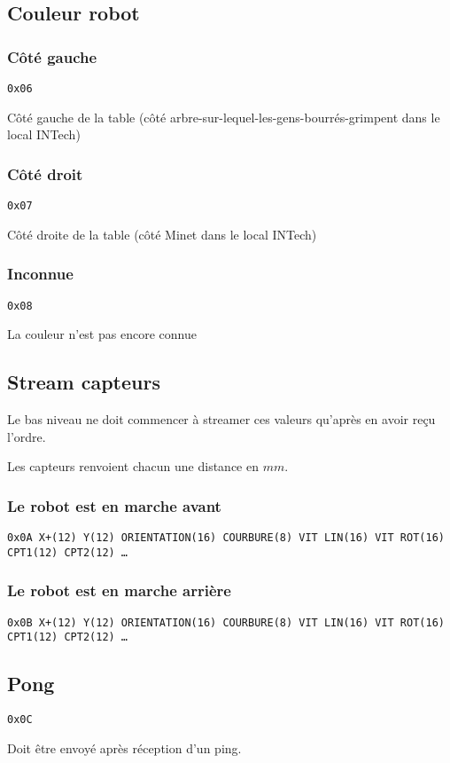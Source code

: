 \documentclass[a4paper, 12pt]{article}
\begin{document}
\subsection{Couleur robot}
\subsubsection{Côté gauche}
\texttt{0x06}
    
Côté gauche de la table (côté arbre-sur-lequel-les-gens-bourrés-grimpent dans le local INTech)
\subsubsection{Côté droit}
\texttt{0x07}
    
Côté droite de la table (côté Minet dans le local INTech)
\subsubsection{Inconnue}
\texttt{0x08}
    
La couleur n'est pas encore connue
    
\subsection{Stream capteurs}

Le bas niveau ne doit commencer à streamer ces valeurs qu'après en avoir reçu l'ordre.

Les capteurs renvoient chacun une distance en $mm$.

\subsubsection{Le robot est en marche avant}
    \texttt{0x0A X+(12) Y(12) ORIENTATION(16) COURBURE(8) VIT  LIN(16) VIT  ROT(16) CPT1(12) CPT2(12) …}
    
\subsubsection{Le robot est en marche arrière}
    \texttt{0x0B X+(12) Y(12) ORIENTATION(16) COURBURE(8) VIT  LIN(16) VIT  ROT(16) CPT1(12) CPT2(12) …}

\subsection{Pong}
     \texttt{0x0C}

Doit être envoyé après réception d'un ping.
\end{document}
